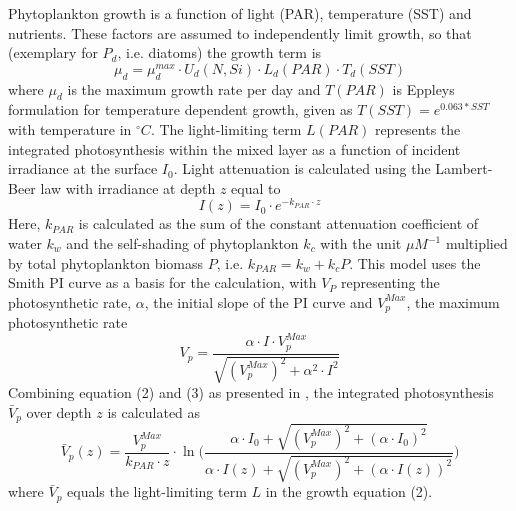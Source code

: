 Phytoplankton growth is a function of light (PAR), temperature (SST) and nutrients. These factors are assumed to independently limit growth, so that (exemplary for $P_{d}$, i.e. diatoms) the growth term is
\begin{equation}
\mu_{d} = \mu_{d}^{max} \cdot U_{d}(N,Si)\cdot L_{d}(PAR)\cdot T_{d}(SST)
\end{equation}
where $\mu_{d}$ is the maximum growth rate per day and $T(PAR)$ is Eppleys formulation for temperature dependent growth, given as $T(SST) = e^{0.063 * SST}$ with temperature in $^\circ C$. The light-limiting term $L(PAR)$ represents the integrated photosynthesis within the mixed layer as a function of incident irradiance at the surface $I_0$. Light attenuation is calculated using the Lambert-Beer law with irradiance at depth $z$ equal to
\begin{equation}
I(z) = I_0 \cdot e^{-k_{PAR} \cdot z}
\end{equation}
Here, $k_{PAR}$ is calculated as the sum of the constant attenuation coefficient of water $k_w$ and the self-shading of phytoplankton $k_c$ with the unit $\mu M^{-1}$ multiplied by total phytoplankton biomass $P$, i.e. $k_{PAR} = k_w + k_c P$. This model uses the Smith PI curve as a basis for the calculation, with $V_P$ representing the photosynthetic rate, $\alpha$, the initial slope of the PI curve and $V_p^{Max}$, the maximum photosynthetic rate
\begin{equation}
V_p = \frac{\alpha \cdot I \cdot V_p^{Max}} {\sqrt{(V_p^{Max})^2 + \alpha^2 \cdot I^2}}
\end{equation}
Combining equation (2) and (3) as presented in \cite{Anderson2015}, the integrated photosynthesis $\bar{V}_p$ over depth $z$ is calculated as
\begin{equation}
\bar{V}_p(z) = \frac{V_p^{Max}}{k_{PAR} \cdot z} \cdot \ln \Bigg( \frac{\alpha \cdot I_0 + \sqrt{(V_p^{Max})^2+(\alpha \cdot I_0)^2}} {\alpha \cdot I(z) + \sqrt{(V_p^{Max})^2+(\alpha \cdot I(z))^2}} \Bigg)
\end{equation}
where $\bar{V}_p$ equals the light-limiting term $L$ in the growth equation (2).

